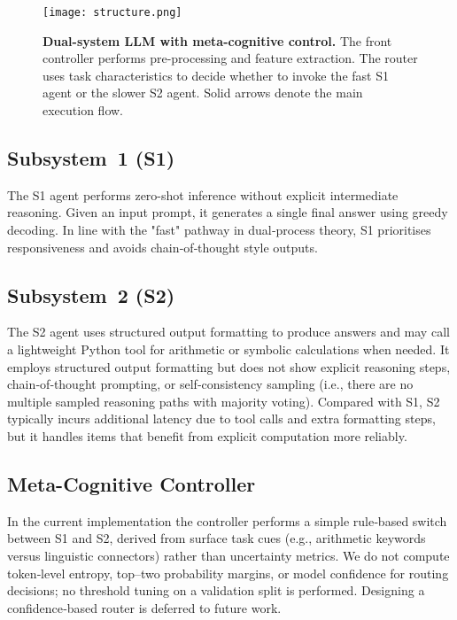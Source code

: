 \documentclass[11pt]{article}
\begin{document}
\begin{figure*}[t]
  \centering
  \texttt{[image: structure.png]}
  \caption{\textbf{Dual-system LLM with meta-cognitive control.}  The front
  controller performs pre-processing and feature extraction.  The router uses
  task characteristics to decide whether to invoke the fast S1
  agent or the slower S2 agent.  Solid arrows denote the main execution flow.}
  \label{fig:arch}
\end{figure*}

\subsection{Subsystem~1 (S1)}
The S1 agent performs zero-shot inference without explicit intermediate reasoning.
Given an input prompt, it generates a single final answer using greedy decoding.
In line with the "fast" pathway in dual‑process theory, S1 prioritises
responsiveness and avoids chain‑of‑thought style outputs.

\subsection{Subsystem~2 (S2)}
The S2 agent uses structured output formatting to produce answers and may call a
lightweight Python tool for arithmetic or symbolic calculations when needed.
It employs structured output formatting but does not show explicit reasoning steps,
chain‑of‑thought prompting, or self‑consistency sampling (i.e., there are no multiple sampled reasoning paths
with majority voting). Compared with S1, S2 typically incurs additional latency due
to tool calls and extra formatting steps, but it handles items that
benefit from explicit computation more reliably.

\subsection{Meta-Cognitive Controller}
In the current implementation the controller performs a simple rule‑based switch
between S1 and S2, derived from surface task cues (e.g., arithmetic keywords
versus linguistic connectors) rather than uncertainty metrics. We do not compute
token‑level entropy, top–two probability margins, or model confidence for routing decisions; no
threshold tuning on a validation split is performed. Designing a confidence‑based
router is deferred to future work.
\end{document}
